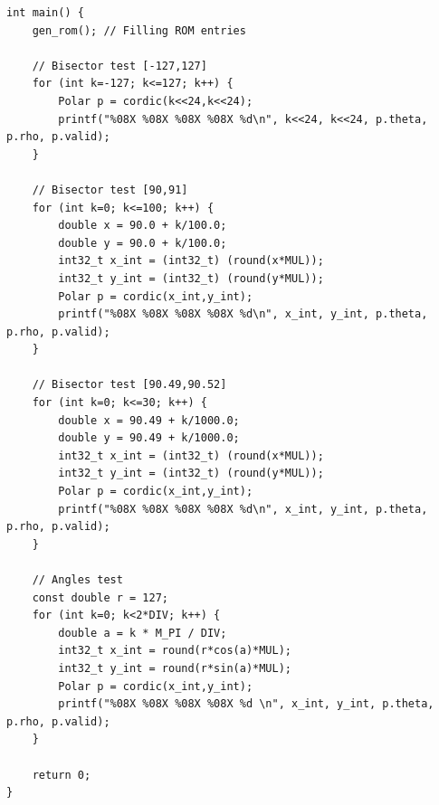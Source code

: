 \documentclass[12pt,a4paper]{report}
\begin{document}
\begin{lstlisting}[caption={Test-data generation}]
int main() {
    gen_rom(); // Filling ROM entries
    
    // Bisector test [-127,127]
    for (int k=-127; k<=127; k++) {
        Polar p = cordic(k<<24,k<<24);
        printf("%08X %08X %08X %08X %d\n", k<<24, k<<24, p.theta, p.rho, p.valid);
    }
    
    // Bisector test [90,91]
    for (int k=0; k<=100; k++) {
        double x = 90.0 + k/100.0;
        double y = 90.0 + k/100.0;
        int32_t x_int = (int32_t) (round(x*MUL));
        int32_t y_int = (int32_t) (round(y*MUL));
        Polar p = cordic(x_int,y_int);     
        printf("%08X %08X %08X %08X %d\n", x_int, y_int, p.theta, p.rho, p.valid);
    }
    
    // Bisector test [90.49,90.52]
    for (int k=0; k<=30; k++) {
        double x = 90.49 + k/1000.0;
        double y = 90.49 + k/1000.0; 
        int32_t x_int = (int32_t) (round(x*MUL));
        int32_t y_int = (int32_t) (round(y*MUL));       
        Polar p = cordic(x_int,y_int);    
        printf("%08X %08X %08X %08X %d\n", x_int, y_int, p.theta, p.rho, p.valid);
    }
    
    // Angles test
    const double r = 127;
    for (int k=0; k<2*DIV; k++) {
        double a = k * M_PI / DIV;
        int32_t x_int = round(r*cos(a)*MUL);
        int32_t y_int = round(r*sin(a)*MUL);
        Polar p = cordic(x_int,y_int);
        printf("%08X %08X %08X %08X %d \n", x_int, y_int, p.theta, p.rho, p.valid);
    }
    
    return 0;
}

\end{lstlisting}
\end{document}
